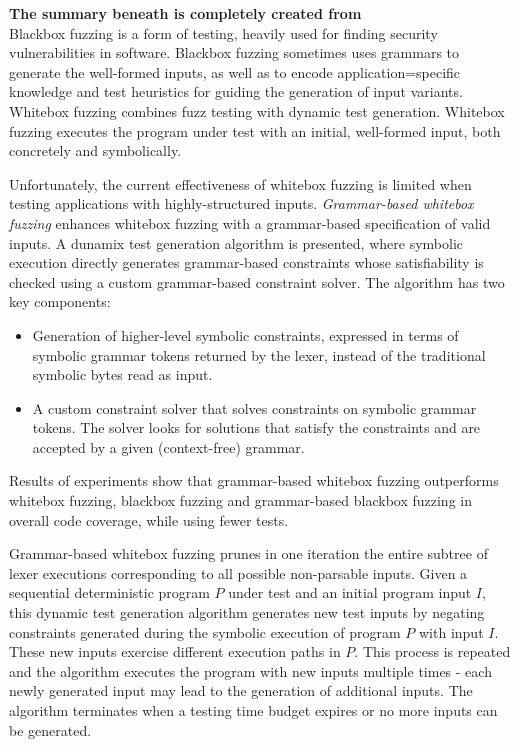 \textbf{The summary beneath is completely created from \cite{godefroid2008grammar}}
\\

Blackbox fuzzing is a form of testing, heavily used for finding security vulnerabilities in software. 
Blackbox fuzzing sometimes uses grammars to generate the well-formed inputs, as well as to encode application=specific knowledge and test heuristics for guiding the generation of input variants.
Whitebox fuzzing combines fuzz testing with dynamic test generation.
Whitebox fuzzing executes the program under test with an initial, well-formed input, both concretely and symbolically.

Unfortunately, the current effectiveness of whitebox fuzzing is limited when testing applications with highly-structured inputs.
\textit{Grammar-based whitebox fuzzing} enhances whitebox fuzzing with a grammar-based specification of valid inputs. A dunamix test generation algorithm is presented, where symbolic execution directly generates grammar-based constraints whose satisfiability is checked using a custom grammar-based constraint solver.
The algorithm has two key components:
\begin{itemize}
    \item Generation of higher-level symbolic constraints, expressed in terms of symbolic grammar tokens returned by the lexer, instead of the traditional symbolic bytes read as input.
    \item A custom constraint solver that solves constraints on symbolic grammar tokens. The solver looks for solutions that satisfy the constraints and are accepted by a given (context-free) grammar.
\end{itemize}

Results of experiments show that grammar-based whitebox fuzzing outperforms whitebox fuzzing, blackbox fuzzing and grammar-based blackbox fuzzing in overall code coverage, while using fewer tests.

Grammar-based whitebox fuzzing prunes in one iteration the entire subtree of lexer executions corresponding to all possible non-parsable inputs.
Given a sequential deterministic program $P$ under test and an initial program input $I$, this dynamic test generation algorithm generates new test inputs by negating constraints generated during the symbolic execution of program $P$ with input $I$. These new inputs exercise different execution paths in $P$. This process is repeated and the algorithm executes the program with new inputs multiple times - each newly generated input may lead to the generation of additional inputs. The algorithm terminates when a testing time budget expires or no more inputs can be generated.

